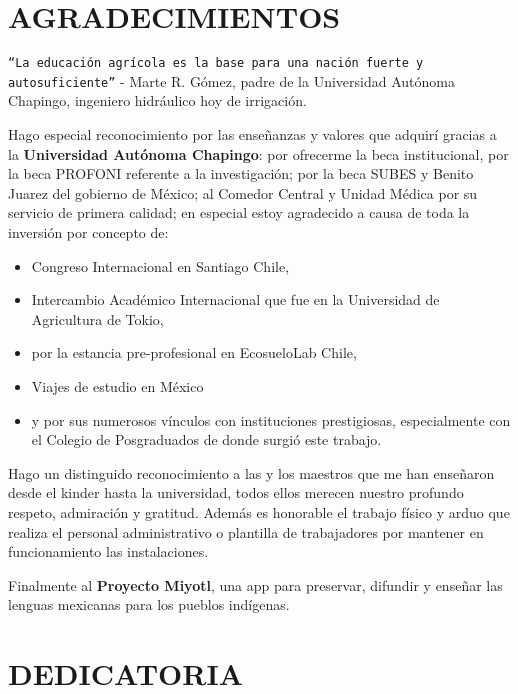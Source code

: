 

\chapter*{AGRADECIMIENTOS}
\begin{center}
    \texttt{``La educación agrícola es la base para una nación fuerte y autosuficiente''} - Marte R. Gómez, padre de la Universidad Autónoma Chapingo, ingeniero hidráulico hoy de irrigación.
\end{center}

Hago especial reconocimiento por las enseñanzas y valores que adquirí gracias a la \textbf{Universidad Autónoma Chapingo}: por ofrecerme la beca institucional, por la beca PROFONI referente a la investigación; por la beca SUBES y Benito Juarez del gobierno de México; al Comedor Central y Unidad Médica por su servicio de primera calidad; en especial estoy agradecido a causa de toda la inversión por concepto de:
\begin{itemize}
    \item Congreso Internacional en Santiago Chile, \item Intercambio Académico Internacional que fue en la Universidad de Agricultura de Tokio, 
    \item por la estancia pre-profesional en EcosueloLab Chile, 
    \item Viajes de estudio en México
    \item y por sus numerosos vínculos con instituciones prestigiosas, especialmente con el Colegio de Posgraduados de donde surgió este trabajo.
\end{itemize}

Hago un distinguido reconocimiento a las y los maestros que me han enseñaron desde el kinder hasta la universidad, todos ellos merecen nuestro profundo respeto, admiración y gratitud. Además es honorable el trabajo físico y arduo que realiza el personal administrativo o plantilla de trabajadores por mantener en funcionamiento las instalaciones.

Finalmente al \textbf{Proyecto Miyotl}, una app para preservar, difundir y enseñar las lenguas mexicanas para los pueblos indígenas.
\newpage

\chapter*{DEDICATORIA}


